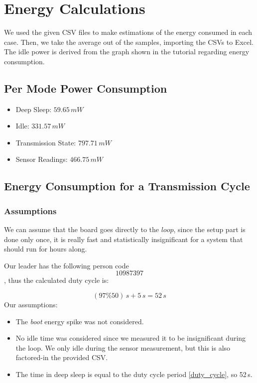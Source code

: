 \documentclass{article}
\begin{document}
\section{Energy Calculations}

We used the given CSV files to make estimations of the energy consumed in each case. Then, we take the average out of the samples, importing the CSVs to Excel. The idle power is derived from the graph shown in the tutorial regarding energy consumption.
\subsection{Per Mode Power Consumption}
\begin{itemize}
    \item Deep Sleep: $59.65\,mW$
    \item Idle: $331.57\,mW$
    \item Transmission State: $797.71\,mW$
    \item Sensor Readings: $466.75\,mW$
\end{itemize}

\subsection{Energy Consumption for a Transmission Cycle}

\subsubsection{Assumptions}
We can assume that the board goes directly to the $loop$, since the setup part is done only once, it is really fast and statistically insignificant for a system that should run for hours along.


\vspace{4mm}
\noindent Our leader has the following person code $$10987397$$, thus the calculated duty cycle is:

\begin{equation} \label{duty_cycle}
     (97\%50)\,s + 5\,s = 52\,s
\end{equation}
\newpage
Our assumptions:
\begin{itemize}
    \item The \textit{boot} energy spike was not considered.
    \item No idle time was considered since we measured it to be insignificant during the loop. We only idle during the sensor measurement, but this is also factored-in the provided CSV.
    \item The time in deep sleep is equal to the duty cycle period \ref{duty_cycle}, so 52\,s.
\end{itemize}
\end{document}
